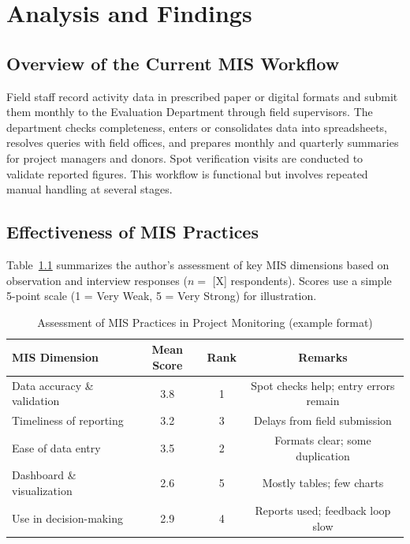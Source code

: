 \documentclass[12pt,a4paper]{report}
\begin{document}
\chapter{Analysis and Findings}

\section{Overview of the Current MIS Workflow}
Field staff record activity data in prescribed paper or digital formats
and submit them monthly to the Evaluation Department through field
supervisors. The department checks completeness, enters or consolidates
data into spreadsheets, resolves queries with field offices, and
prepares monthly and quarterly summaries for project managers and
donors. Spot verification visits are conducted to validate reported
figures. This workflow is functional but involves repeated manual
handling at several stages.

\section{Effectiveness of MIS Practices}
Table~\ref{tab:findings} summarizes the author's assessment of key MIS
dimensions based on observation and interview responses
(\(n =\) [X] respondents). %
Scores use a simple 5-point scale (1 = Very Weak, 5 = Very Strong) for
illustration.

\begin{table}[H]
    \centering
    \caption{Assessment of MIS Practices in Project Monitoring (example format)}
    \label{tab:findings}
    \begin{tabular}{lccc}
        \toprule
        \textbf{MIS Dimension} & \textbf{Mean Score} & \textbf{Rank} & \textbf{Remarks} \\
        \midrule
        Data accuracy \& validation   & 3.8 & 1 & Spot checks help; entry errors remain \\
        Timeliness of reporting       & 3.2 & 3 & Delays from field submission \\
        Ease of data entry            & 3.5 & 2 & Formats clear; some duplication \\
        Dashboard \& visualization    & 2.6 & 5 & Mostly tables; few charts \\
        Use in decision-making        & 2.9 & 4 & Reports used; feedback loop slow \\
        \bottomrule
    \end{tabular}
\end{table}
\end{document}
